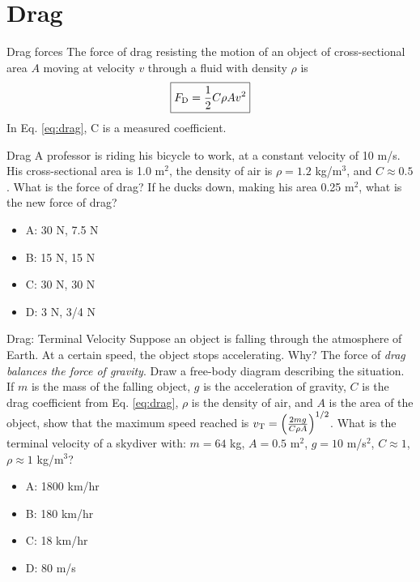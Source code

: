 \documentclass{beamer}
\begin{document}
\section{Drag}

\begin{frame}{Drag forces}
The force of drag resisting the motion of an object of cross-sectional area $A$ moving at velocity $v$ through a fluid with density $\rho$ is \\
\begin{equation}
\boxed{F_{\rm D} = \frac{1}{2}C\rho A v^2}
\label{eq:drag}
\end{equation}
In Eq. \ref{eq:drag}, C is a measured coefficient.
\end{frame}

\begin{frame}{Drag}
A professor is riding his bicycle to work, at a constant velocity of 10 m/s.  His cross-sectional area is 1.0 m$^2$, the density of air is $\rho = 1.2$ kg/m$^3$, and $C \approx 0.5$.  What is the force of drag?  If he ducks down, making his area 0.25 m$^2$, what is the new force of drag?
\begin{itemize}
\item A: 30 N, 7.5 N
\item B: 15 N, 15 N
\item C: 30 N, 30 N
\item D: 3 N, 3/4 N
\end{itemize}
\end{frame}

\begin{frame}{Drag: Terminal Velocity}
\small
Suppose an object is falling through the atmosphere of Earth.  At a certain speed, the object stops accelerating.  Why?  The force of \textit{drag balances the force of gravity}.  Draw a free-body diagram describing the situation.  If $m$ is the mass of the falling object, $g$ is the acceleration of gravity, $C$ is the drag coefficient from Eq. \ref{eq:drag}, $\rho$ is the density of air, and $A$ is the area of the object, show that the maximum speed reached is $v_{\rm T} = \left(\frac{2mg}{C\rho A}\right)^{1/2}$.  What is the terminal velocity of a skydiver with: $m = 64$ kg, $A = 0.5$ m$^2$, $g = 10$ m/s$^2$, $C \approx 1$, $\rho \approx 1$ kg/m$^3$?
\begin{itemize}
\item A: 1800 km/hr
\item B: 180 km/hr
\item C: 18 km/hr
\item D: 80 m/s
\end{itemize}
\end{frame}
\end{document}
